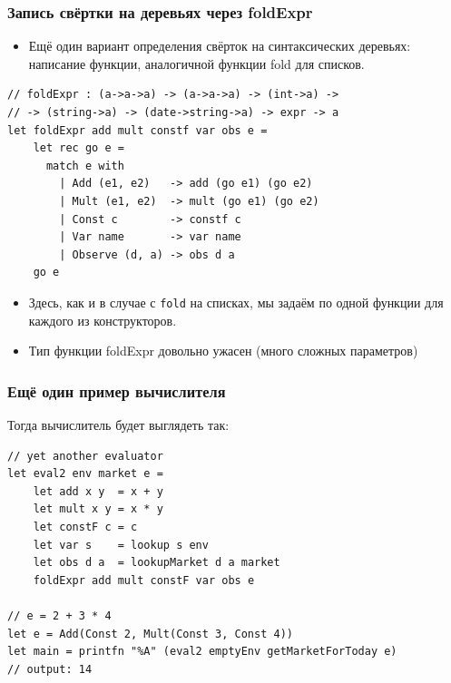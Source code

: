 \documentclass{beamer}
\begin{document}
\begin{frame}[fragile]
\frametitle{Запись свёртки на деревьях через foldExpr}

\begin{itemize}
\item
  Ещё один вариант определения свёрток на синтаксических деревьях:
  написание функции, аналогичной функции fold для списков.
\end{itemize}
\begin{lstlisting}
// foldExpr : (a->a->a) -> (a->a->a) -> (int->a) -> 
// -> (string->a) -> (date->string->a) -> expr -> a
let foldExpr add mult constf var obs e =
    let rec go e = 
      match e with 
        | Add (e1, e2)   -> add (go e1) (go e2)
        | Mult (e1, e2)  -> mult (go e1) (go e2)
        | Const c        -> constf c
        | Var name       -> var name
        | Observe (d, a) -> obs d a
    go e
\end{lstlisting}
\begin{itemize}
\item
  Здесь, как и в случае с \texttt{fold} на списках, мы задаём по одной
  функции для каждого из конструкторов.
\item
  Тип функции foldExpr довольно ужасен (много сложных параметров)
\end{itemize}
\end{frame}

\begin{frame}[fragile]
\frametitle{Ещё один пример вычислителя}

Тогда вычислитель будет выглядеть так:

\begin{lstlisting}
// yet another evaluator
let eval2 env market e =
    let add x y  = x + y
    let mult x y = x * y
    let constF c = c
    let var s    = lookup s env
    let obs d a  = lookupMarket d a market
    foldExpr add mult constF var obs e

// e = 2 + 3 * 4
let e = Add(Const 2, Mult(Const 3, Const 4))
let main = printfn "%A" (eval2 emptyEnv getMarketForToday e)
// output: 14
\end{lstlisting}
\end{frame}
\end{document}
